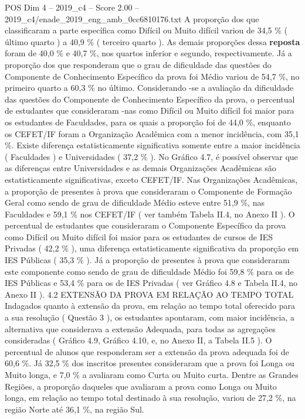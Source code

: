 \begin{textsample}{POS Dim 4 – 2019\_c4 – Score 2.00 – 2019\_c4/enade\_2019\_eng\_amb\_0cc6810176.txt}
A proporção dos que classificaram a parte específica como Difícil ou Muito difícil variou de 34,5 \% ( último quarto ) a 40,9 \% ( terceiro quarto ).
As demais proporções dessa \textbf{reposta} foram de 40,0 \% e 40,7 \%, nos quartos inferior e segundo, respectivamente.
Já a proporção dos que responderam que o grau de dificuldade das questões do Componente de Conhecimento Específico da prova foi Médio variou de 54,7 \%, no primeiro quarto a 60,3 \% no último.
Considerando -se a avaliação da dificuldade das questões do Componente de Conhecimento Específico da prova, o percentual de estudantes que consideraram -nas como Difícil ou Muito difícil foi maior para os estudantes de Faculdades, para os quais a proporção foi de 44,0 \%, enquanto os CEFET/IF foram a Organização Acadêmica com a menor incidência, com 35,1 \%.
Existe diferença estatisticamente significativa somente entre a maior incidência ( Faculdades ) e Universidades ( 37,2 \% ).
No Gráfico 4.7, é possível observar que as diferenças entre Universidades e as demais Organizações Acadêmicas são estatisticamente significativas, exceto CEFET/IF.
Nas Organizações Acadêmicas, a proporção de presentes à prova que consideraram o Componente de Formação Geral como sendo de grau de dificuldade Médio esteve entre 51,9 \%, nas Faculdades e 59,1 \% nos CEFET/IF ( ver também Tabela II.4, no Anexo II ).
O percentual de estudantes que consideraram o Componente Específico da prova como Difícil ou Muito difícil foi maior para os estudantes de cursos de IES Privadas ( 42,2 \% ), uma diferença estatisticamente significativa da proporção em IES Públicas ( 35,3 \% ).
Já a proporção de presentes à prova que consideraram este componente como sendo de grau de dificuldade Médio foi 59,8 \% para os de IES Públicas e 53,4 \% para os de IES Privadas ( ver Gráfico 4.8 e Tabela II.4, no Anexo II ). 4.2 EXTENSÃO DA PROVA EM RELAÇÃO AO TEMPO TOTAL Indagados quanto à extensão da prova, em relação ao tempo total oferecido para a sua resolução ( Questão 3 ), os estudantes apontaram, com maior incidência, a alternativa que considerava a extensão Adequada, para todas as agregações consideradas ( Gráfico 4.9, Gráfico 4.10, e, no Anexo II, a Tabela II.5 ).
O percentual de alunos que responderam ser a extensão da prova adequada foi de 60,6 \%.
Já 32,5 \% dos inscritos presentes consideraram que a prova foi Longa ou Muito longa, e 7,0 \% a avaliaram como Curta ou Muito curta.
Dentre as Grandes Regiões, a proporção daqueles que avaliaram a prova como Longa ou Muito longa, em relação ao tempo total destinado à sua resolução, variou de 27,2 \%, na região Norte até 36,1 \%, na região Sul.

\end{textsample}

